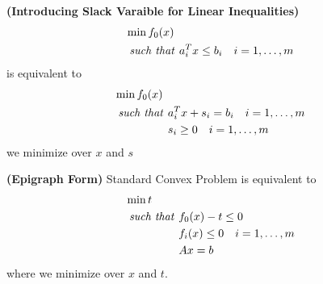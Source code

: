 \begin{proposition}{\textbf{(Introducing Slack Varaible for Linear Inequalities)}}
    \begin{equation*}
    \begin{aligned}
        &\min f_0(x) \\
        &\text{\emph{ such that }} \begin{aligned}[t]
            &a_i^Tx\le b_i \quad i=1,\dots,m \\
        \end{aligned}
    \end{aligned}
    \end{equation*}
    is equivalent to 
    \begin{equation*}
    \begin{aligned}
        &\min f_0(x) \\
        &\text{\emph{ such that }} \begin{aligned}[t]
            &a_i^Tx +s_i = b_i \quad i=1,\dots,m \\
            &s_i\ge0 \quad i=1,\dots,m \\
        \end{aligned}
    \end{aligned}
    \end{equation*}
    we minimize over $x$ and $s$
\end{proposition}

\begin{proposition}{\textbf{(Epigraph Form)}}
    Standard Convex Problem is equivalent to 
    \begin{equation*}
    \begin{aligned}
        &\min t \\
        &\text{\emph{ such that }} \begin{aligned}[t]
            &f_0(x)-t\le0 \\
            &f_i(x)\le0 \quad i=1,\dots,m \\
            &Ax=b
        \end{aligned}
    \end{aligned}
    \end{equation*}
    where we minimize over $x$ and $t$.
\end{proposition}

